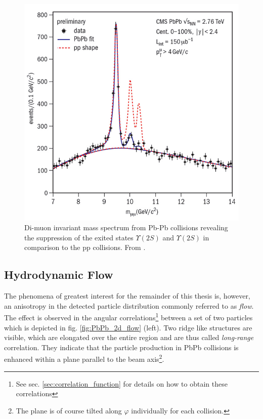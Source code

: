 \begin{figure}
  \centering
  \includegraphics[width=.6\textwidth]{figures/upsilon.jpg}
  \caption[Di-muon invariant mass spectrum from Pb-Pb collisions revealing the suppression of the exited states $\Upsilon(2S)$ and $\Upsilon(2S)$.]{Di-muon invariant mass spectrum from Pb-Pb collisions revealing the suppression of the exited states $\Upsilon(2S)$ and $\Upsilon(2S)$ in comparison to the pp collisions. From \cite{Velkovska2012}.}
  \label{fig:upsilon_suppression}
\end{figure}

\subsection{Hydrodynamic Flow}
\label{sec:flow}

The phenomena of greatest interest for the remainder of this thesis is, however, an anisotropy in the detected particle distribution commonly referred to as \emph{flow}. The effect is observed in the angular correlations\footnote{See sec. \ref{sec:correlation_function} for details on how to obtain these correlations} between a set of two particles which is depicted in fig. \ref{fig:PbPb_2d_flow} (left). Two ridge like structures are visible,  which are elongated over the entire \deta region and are thus called \emph{long-range} correlation. They indicate that the particle production in \gls{PbPb} collisions is enhanced within a plane parallel to the beam axis\footnote{The plane is of course tilted along $\varphi$ individually for each collision.}. 

